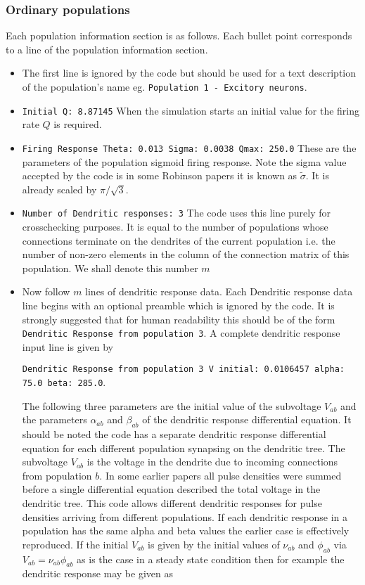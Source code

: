 \documentclass[12pt,a4paper]{article}
\begin{document}
\subsubsection{Ordinary populations}
Each population information section is as follows. Each bullet point
corresponds to a line of the population information section.
\begin{itemize}
\item The first line is ignored by the code but should be used for
a text description of the population's name eg. 
{\tt \small Population 1 - Excitory neurons}.
\item {\tt \small Initial Q: 8.87145} When the simulation starts an initial
value for the firing rate $Q$ is required.
\item {\tt \small Firing Response Theta: 0.013 Sigma: 0.0038 Qmax: 250.0} These
are the parameters of the population sigmoid firing response. Note the
sigma value accepted by the code is in some Robinson papers it is known as $\tilde{\sigma}$.
It is already scaled  by $\pi / \sqrt{3}$.
\item {\tt \small Number of Dendritic responses: 3} The code uses this line
purely for crosschecking purposes. It is equal to the number of
populations whose connections terminate on the dendrites of the current
population i.e. the number of non-zero elements in the column 
of the connection matrix of this population. We shall denote this number 
$m$
\item Now follow $m$ lines of dendritic response data. Each Dendritic
response data line begins with an optional preamble which is ignored 
by the code. It is strongly suggested that for human readability this
should be of the form {\tt \small Dendritic Response from population 3}. A complete
dendritic response input line is given by

{\tt \small Dendritic Response from population 3 V initial: 0.0106457 alpha: 75.0 beta: 285.0}.

The following three parameters are the initial value of the subvoltage $V_{ab}$
and the parameters $\alpha_{ab}$ and $\beta_{ab}$ of the dendritic response differential
equation. It should be noted the code has a separate dendritic response
differential equation for each different population synapsing on the
dendritic tree. The subvoltage $V_{ab}$ is the voltage in the dendrite due to
incoming connections from population $b$. In some earlier papers all
pulse densities were summed before a single differential equation described
the total voltage in the dendritic tree. This code allows different 
dendritic responses for pulse densities arriving from different populations. If
each dendritic response in a population has the same alpha and beta values
the earlier case is effectively reproduced. If the initial $V_{ab}$ is given by
the initial values of $\nu_{ab}$ and $\phi_{ab}$ via $V_{ab}= \nu_{ab} \phi_{ab}$
as is the case in a steady state condition then for example 
the dendritic response may be given as


\end{itemize}
\end{document}
